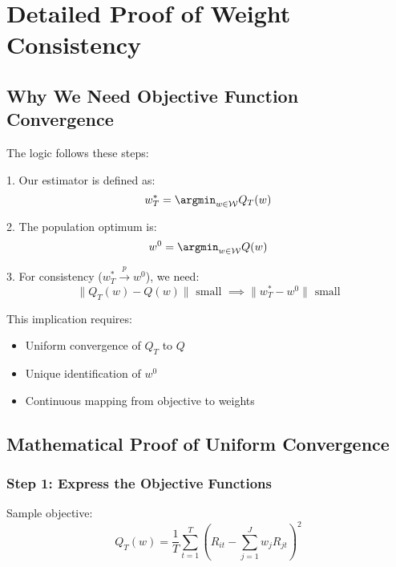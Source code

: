 \documentclass[12pt,article]{memoir}
\begin{document}

\Vhrulefill

\section{Detailed Proof of Weight Consistency}

\subsection{Why We Need Objective Function Convergence}

The logic follows these steps:

1. Our estimator is defined as:
\begin{equation}
    w_T^* = \argmin_{w \in \mathcal{W}} Q_T(w)
\end{equation}

2. The population optimum is:
\begin{equation}
    w^0 = \argmin_{w \in \mathcal{W}} Q(w)
\end{equation}

3. For consistency ($w_T^* \xrightarrow{p} w^0$), we need:
\begin{equation}
    \|Q_T(w) - Q(w)\| \text{ small } \implies \|w_T^* - w^0\| \text{ small}
\end{equation}

This implication requires:
\begin{itemize}
    \item Uniform convergence of $Q_T$ to $Q$
    \item Unique identification of $w^0$
    \item Continuous mapping from objective to weights
\end{itemize}

\subsection{Mathematical Proof of Uniform Convergence}

\subsubsection{Step 1: Express the Objective Functions}

Sample objective:
\begin{equation}
    Q_T(w) = \frac{1}{T}\sum_{t=1}^T (R_{it} - \sum_{j=1}^J w_jR_{jt})^2
\end{equation}
\end{document}
